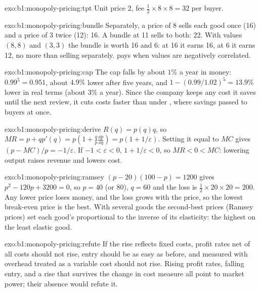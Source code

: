 \begin{solution}{exo:b1:monopoly-pricing:tpt}
Unit price 2, fee $\tfrac12 \times 8 \times 8 = 32$ per buyer.
\end{solution}

\begin{solution}{exo:b1:monopoly-pricing:bundle}
Separately, a price of 8 sells each good once (16) and a price of 3 twice
(12): 16. A bundle at 11 sells to both: 22. With values $(8, 8)$ and $(3, 3)$
the bundle is worth 16 and 6: at 16 it earns 16, at 6 it earns 12, no more
than selling separately.  pays when values are negatively
correlated.
\end{solution}

\begin{solution}{exo:b1:monopoly-pricing:cap}
The cap falls by about $1\%$ a year in money: $0.99^5 = 0.951$, about $4.9\%$ lower
after five years, and $1 - (0.99/1.02)^5 = 13.9\%$ lower in real terms (about $3\%$ a year). Since the company
keeps any cost it saves until the next review, it cuts costs faster than
under , where savings passed to buyers at once.
\end{solution}

\begin{solution}{exo:b1:monopoly-pricing:derive}
$R(q) = p(q)q$, so $MR = p + qp'(q) = p(1 + \frac qp\frac{\dd p}{\dd q}) = p(1 + 1/\varepsilon)$. Setting it equal
to $MC$ gives $(p - MC)/p = -1/\varepsilon$. If $-1 < \varepsilon < 0$, $1 + 1/\varepsilon < 0$, so $MR < 0 < MC$:
lowering output raises revenue and lowers cost.
\end{solution}

\begin{solution}{exo:b1:monopoly-pricing:ramsey}
$(p - 20)(100 - p) = 1200$ gives $p^2 - 120p + 3200 = 0$, so $p = 40$ (or 80), $q = 60$ and
the loss is $\tfrac12 \times 20 \times 20 = 200$. Any lower price loses money, and the loss
grows with the price, so the lowest break-even price is the best. With
several goods the second-best prices (Ramsey prices) set each good's  proportional to the inverse of its elasticity: the highest  on
the least elastic good.
\end{solution}

\begin{solution}{exo:b1:monopoly-pricing:refute}
If the rise reflects fixed costs, profit rates net of all costs should not
rise, entry should be as easy as before, and  measured with overhead
treated as a variable cost should not rise. Rising profit rates, falling
entry, and a rise that survives the change in cost measure all point to
market power; their absence would refute it.
\end{solution}


